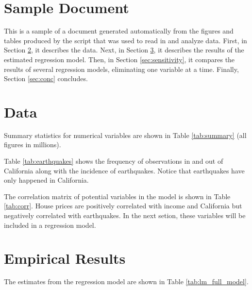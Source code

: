 \documentclass{paper}
\begin{document}

\section{Sample Document}

This is a sample of a document generated automatically from the figures and tables produced by
the script that was used to read in and analyze data.
First, in Section \ref{sec:data}, it describes the data.
Next, in Section \ref{sec:results}, it describes the results of the estimated regression model.
Then, in Section \ref{sec:sensitivity}, it compares the results of several regression models, eliminating one variable at a time.
Finally, Section \ref{sec:conc} concludes. 


\section{Data} \label{sec:data}

Summary statistics for numerical variables are shown in Table \ref{tab:summary} (all figures in millions).




Table \ref{tab:earthquakes} shows the frequency of observations in and out of California along with the incidence of earthquakes. Notice that earthquakes have only happened in California.



The correlation matrix of potential variables in the model is shown in Table \ref{tab:corr}.
House prices are positively correlated with income and California but negatively correlated with earthquakes. In the next setion, these variables will be included in a regression model.





\pagebreak
\section{Empirical Results}  \label{sec:results}


The estimates from the regression model are shown in Table \ref{tab:lm_full_model}.




\end{document}
